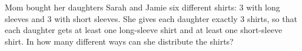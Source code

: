 Mom bought her daughters Sarah and Jamie six different shirts: $3$ with long sleeves and $3$ with short sleeves. She gives each daughter exactly $3$ shirts, so that each daughter gets at least one long-sleeve shirt and at least one short-sleeve shirt. In how many different ways can she distribute the shirts?
